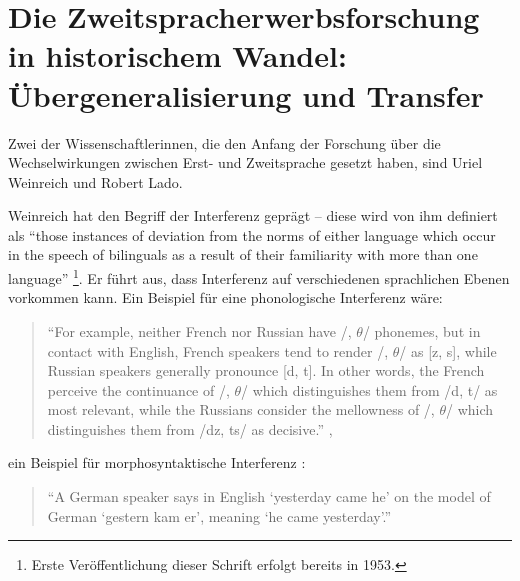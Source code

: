 \section{Die Zweitspracherwerbsforschung in historischem Wandel: Übergeneralisierung und Transfer}

Zwei der Wissenschaftlerinnen, die den Anfang der Forschung über die Wechselwirkungen zwischen Erst- und Zweitsprache gesetzt haben, sind Uriel Weinreich und Robert Lado.

Weinreich hat den Begriff der Interferenz geprägt --
diese wird von ihm definiert als ``those instances of deviation from the norms of either language which occur in the speech of bilinguals as a result of their familiarity with more than one language'' \cite[S.1]{Weinreich79}\footnote{Erste Veröffentlichung dieser Schrift erfolgt bereits in 1953.}.
Er führt aus, dass Interferenz auf verschiedenen sprachlichen Ebenen vorkommen kann.
Ein Beispiel für eine phonologische Interferenz wäre:
\begin{quote}
``For example, neither French nor Russian have /, $\theta$/ phonemes, but in contact
    with English, French speakers tend to render /, $\theta$/ as [z, s], while Russian
    speakers generally pronounce [d, t].
    In other words, the French perceive the continuance of /, $\theta$/ which distinguishes them from /d, t/ as most relevant, while
    the Russians consider the mellowness of /, $\theta$/ which distinguishes them from /dz, ts/ as decisive.''
    \cite[S.12]{Weinreich79},
\end{quote}
ein Beispiel für morphosyntaktische Interferenz :
\begin{quote}
``A German speaker says in English `yesterday came he' on the model of German
`gestern kam er', meaning `he came yesterday'.''
\cite[S.13]{Weinreich79}
\end{quote}





